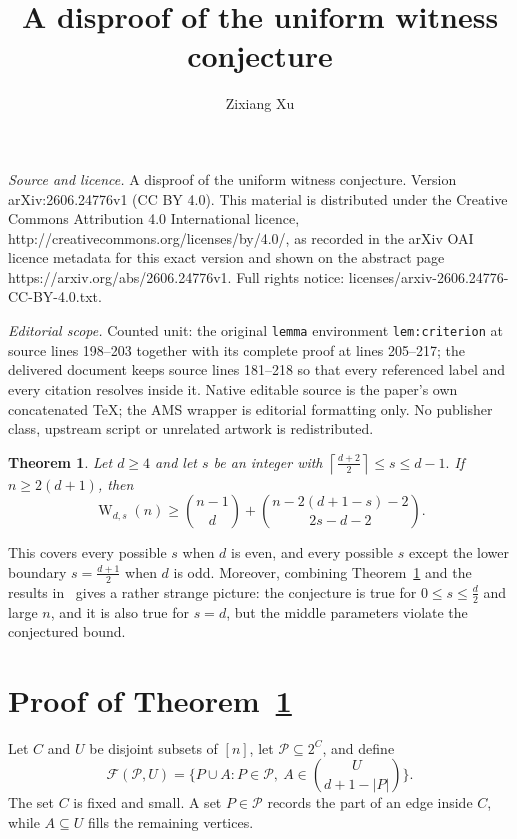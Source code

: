 \documentclass[10pt,a4paper]{amsart}
\newtheorem{theorem}{Theorem}[section]
\newcommand{\cP}{\mathcal{P}}
\newcommand{\cF}{\mathcal{F}}
\newcommand{\W}{\operatorname{W}}
\begin{document}
\title[A disproof of the uniform witness conjecture]{A disproof of the uniform witness conjecture}
\author{Zixiang Xu}
\date{}
\maketitle
\noindent\emph{Source and licence.} A disproof of the uniform witness conjecture. Version arXiv:2606.24776v1 (CC BY 4.0). This material is distributed under the Creative Commons Attribution 4.0 International licence, http://creativecommons.org/licenses/by/4.0/, as recorded in the arXiv OAI licence metadata for this exact version and shown on the abstract page https://arxiv.org/abs/2606.24776v1. Full rights notice: licenses/arxiv-2606.24776-CC-BY-4.0.txt.\par\smallskip
\noindent\textit{Editorial scope.} Counted unit: the original \texttt{lemma} environment \texttt{lem:criterion} at source lines 198--203 together with its complete proof at lines 205--217; the delivered document keeps source lines 181--218 so that every referenced label and every citation resolves inside it. Native editable source is the paper's own concatenated TeX; the AMS wrapper is editorial formatting only. No publisher class, upstream script or unrelated artwork is redistributed.
\begin{theorem}\label{thm:main}
Let \(d\ge4\) and let \(s\) be an integer with
\(\left\lceil \frac{d+2}{2}\right\rceil\le s\le d-1.\) If \(n\ge2(d+1)\), then
\[
\W_{d,s}(n)\ge\binom{n-1}{d}+\binom{n-2(d+1-s)-2}{2s-d-2}.
\]
\end{theorem}
This covers every possible \(s\) when \(d\) is even, and every possible \(s\) except the lower boundary \(s=\frac{d+1}{2}\) when \(d\) is odd. Moreover, combining Theorem~\ref{thm:main} and the results in~\cite{2025CombProof,2026Chao,1961EKR} gives a rather strange picture: the conjecture is true for \(0\le s\le \frac{d}{2}\) and large \(n\), and it is also true for \(s=d\), but the middle parameters violate the conjectured bound.

\section{Proof of Theorem~\ref{thm:main}}

Let \(C\) and \(U\) be disjoint subsets of \([n]\), let \(\cP\subseteq 2^C\), and define
\[
\cF(\cP,U)=\bigg\{P\cup A:P\in\cP,\ A\in\binom{U}{d+1-|P|}\bigg\}.
\]
The set \(C\) is fixed and small. A set \(P\in\cP\) records the part of an edge inside \(C\), while \(A\subseteq U\) fills the remaining vertices.
\end{document}
